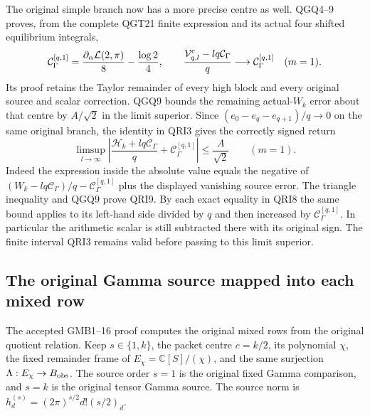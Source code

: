\documentclass[11pt,a4paper]{article}
\begin{document}
The original simple branch now has a more precise centre as well.
QGQ4--9 proves, from the complete QGT21 finite expression and its
actual four shifted equilibrium integrals,
\[
 \mathcal C_\Gamma^{[q,1]}
       =\frac{\partial_\alpha\mathcal L(2,\pi)}8
                            -\frac{\log2}{4},\qquad
 \frac{\mathcal V^{\rm c}_{q,l}-lq\mathcal C_\Gamma}{q}
                            \longrightarrow\mathcal C_\Gamma^{[q,1]}
 \quad(m=1).
\]
Its proof retains the Taylor remainder of every high block and
every original source and scalar correction. QGQ9 bounds the
remaining actual-$W_k$ error about that centre by $A/\sqrt2$
in the limit superior. Since
$(e_0-e_q-e_{q+1})/q\to0$ on the same original branch, the
identity in QRI3 gives the correctly signed return
\[
 \boxed{\displaystyle
 \limsup_{l\to\infty}
 \left|\frac{\mathcal H_k+lq\mathcal C_\Gamma}{q}
                         +\mathcal C_\Gamma^{[q,1]}\right|
                \le\frac A{\sqrt2}\qquad(m=1).}
 \tag{QRI9}
\]
Indeed the expression inside the absolute value equals the
negative of
$(W_k-lq\mathcal C_\Gamma)/q-\mathcal C_\Gamma^{[q,1]}$
plus the displayed vanishing source error. The triangle inequality
and QGQ9 prove QRI9. By each exact equality in QRI8 the same bound
applies to its left-hand side divided by $q$ and then increased
by $\mathcal C_\Gamma^{[q,1]}$. In particular the arithmetic scalar
is still subtracted there with its original sign. The finite
interval QRI3 remains valid before passing to this limit superior.

\subsection{The original Gamma source mapped into each mixed row}

The accepted GMB1--16 proof computes the original mixed rows from
the original quotient relation. Keep $s\in\{1,k\}$, the packet
centre $c=k/2$, its polynomial $\chi$, the fixed remainder frame
of $E_\chi=\mathbb C[S]/(\chi)$, and the same surjection
$\Lambda:E_\chi\to B_{\rm obs}$. The source order $s=1$ is
the original fixed Gamma comparison, and $s=k$ is the original
tensor Gamma source. The source norm is
$h_d^{(s)}=(2\pi)^{s/2}d!(s/2)_d$.
\end{document}
